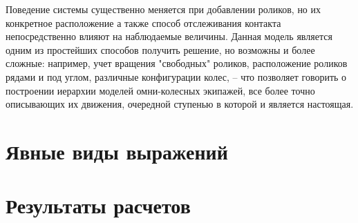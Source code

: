 Поведение системы существенно меняется при добавлении роликов, но их конкретное расположение а также способ отслеживания контакта непосредственно влияют на наблюдаемые величины. Данная модель является одним из простейших способов получить решение, но возможны и более сложные: например, учет вращения "свободных" роликов, расположение роликов рядами и под углом, различные конфигурации колес, -- что позволяет говорить о построении иерархии моделей омни-колесных экипажей, все более точно описывающих их движения, очередной ступенью в которой и является настоящая.



\newpage

\appendix

\section{Явные виды выражений}


\section{Результаты расчетов}





